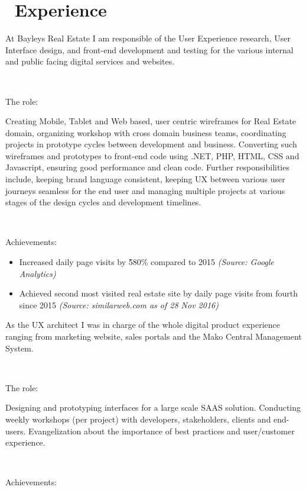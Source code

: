 \documentclass{resume}
\begin{document}
\section{\faUsers\ Experience}
  At Bayleys Real Estate I am responsible of the User Experience research, User Interface design, and front-end development and testing for the various internal and public facing digital services and websites.\par
  ~\par
  {The role:}\par
  Creating Mobile, Tablet and Web based, user centric wireframes for Real Estate domain, organizing workshop with cross domain business teams, coordinating projects in prototype cycles between development and business. Converting such wireframes and prototypes to front-end code using .NET, PHP, HTML, CSS and Javascript, ensuring good performance and clean code.  Further responsibilities include, keeping brand language consistent, keeping UX between various user journeys seamless for the end user and managing multiple projects at various stages of the design cycles and development timelines.\par
  ~\par
  {Achievements:}\par
  \begin{itemize}
    \item Increased daily page visits by \~580\% compared to 2015 \textit{(Source: Google Analytics)}
    \item Achieved second most visited real estate site by daily page visits from fourth since 2015 \textit{(Source: similarweb.com as of 28 Nov 2016)}
  \end{itemize}
  As the UX architect I was in charge of the whole digital product experience ranging from marketing website, sales portals and the Mako Central Management System.\par
  ~\par
  {The role:}\par
  Designing and prototyping interfaces for a large scale SAAS solution. Conducting weekly workshops (per project) with developers, stakeholders, clients and end-users. Evangelization about the importance of best practices and user/customer experience.\par
  ~\par
  {Achievements:}\par
\end{document}

